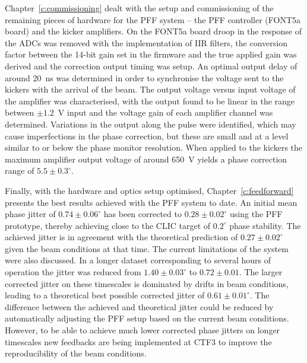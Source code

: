 Chapter~\ref{c:commissioning} dealt with the setup and commissioning of the remaining pieces of hardware for the PFF system -- the PFF controller (FONT5a board) and the kicker amplifiers. On the FONT5a board droop in the response of the ADCs was removed with the implementation of IIR filters, the conversion factor between the 14-bit gain set in the firmware and the true applied gain was derived and the correction output timing was setup. An optimal output delay of around 20~ns was determined in order to synchronise the voltage sent to the kickers with the arrival of the beam. The output voltage versus input voltage of the amplifier was characterised, with the output found to be linear in the range between \(\pm1.2\)~V input and the voltage gain of each amplifier channel was determined. Variations in the output along the pulse were identified, which may cause imperfections in the phase correction, but these are small and at a level similar to or below the phase monitor resolution. When applied to the kickers the maximum amplifier output voltage of around 650~V yields a phase correction range of \(5.5\pm0.3^\circ\).

Finally, with the hardware and optics setup optimised, Chapter~\ref{c:feedforward} presents the best results achieved with the PFF system to date. An initial mean phase jitter of \(0.74\pm0.06^\circ\) has been corrected to \(0.28\pm0.02^\circ\) using the PFF prototype, thereby achieving close to the CLIC target of \(0.2^\circ\) phase stability. The achieved jitter is in agreement with the theoretical prediction of \(0.27\pm0.02^\circ\) given the beam conditions at that time. The current limitations of the system were also discussed. In a longer dataset corresponding to several hours of operation the jitter was reduced from \(1.40\pm0.03^\circ\) to \(0.72\pm0.01\). The larger corrected jitter on these timescales is dominated by drifts in beam conditions, leading to a theoretical best possible corrected jitter of \(0.61\pm0.01^\circ\). The difference between the achieved and theoretical jitter could be reduced by automatically adjusting the PFF setup based on the current beam conditions. However, to be able to achieve much lower corrected phase jitters on longer timescales new feedbacks are being implemented at CTF3 to improve the reproducibility of the beam conditions. 


